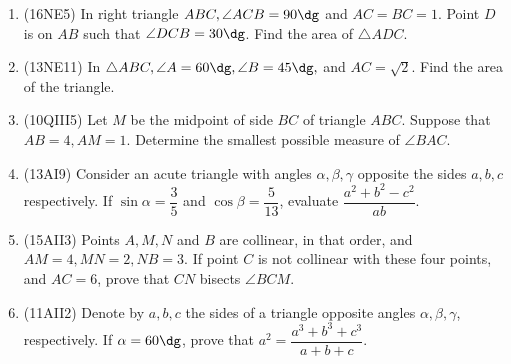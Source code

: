 \documentclass[10pt,paper=letter]{scrartcl}
\begin{document}
\begin{enumerate}

\item (16NE5) In right triangle $ABC, \angle ACB = 90\dg$ and $AC = BC = 1$. Point $D$ is on $AB$ such that $\angle DCB = 30\dg$. Find the area of $\triangle ADC$.

\item (13NE11) In $\triangle ABC, \angle A = 60\dg, \angle B = 45\dg,$ and $AC = \sqrt{2}$. Find the area of the triangle.



\item (10QIII5) Let $M$ be the midpoint of side $BC$ of triangle $ABC$. Suppose that $AB = 4, AM = 1$. Determine the smallest possible measure of $\angle BAC$.


\item (13AI9) Consider an acute triangle with angles $\alpha, \beta, \gamma$ opposite the sides $a, b, c$ respectively. If $\sin \alpha = \dfrac{3}{5}$ and $\cos \beta = \dfrac{5}{13}$, evaluate $\dfrac{a^2+b^2-c^2}{ab}.$

\item (15AII3) Points $A, M, N$ and $B$ are collinear, in that order, and $AM = 4, MN = 2, NB = 3.$ If point $C$ is not collinear with these four points, and $AC = 6$, prove that $CN$ bisects $\angle BCM$.


\item (11AII2) Denote by $a, b, c$ the sides of a triangle opposite angles $\alpha, \beta, \gamma$, respectively. If $\alpha = 60\dg$, prove that $a^2 = \dfrac{a^3+b^3+c^3}{a+b+c}.$

\end{enumerate}
\end{document}
